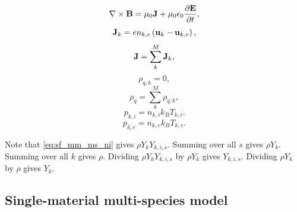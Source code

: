 \documentclass[a4paper,11pt]{report}
\begin{document}
\begin{equation}
    \label{eq:sf_mm_ms_maxwell_2}
    \nabla \times \mathbf{B} = \mu_0 \mathbf{J} + \mu_0 \epsilon_0 \frac{\partial \mathbf{E}}{\partial t},
\end{equation}
\begin{equation}
    \label{eq:sf_mm_ms_curr_density}
    \mathbf{J}_k = e n_{k,e} \left( \mathbf{u}_k - \mathbf{u}_{k,e} \right),
\end{equation}
\begin{equation}
    \mathbf{J} = \sum_k^M \mathbf{J}_k,
\end{equation}
\begin{equation}
    \label{eq:sf_mm_ms_mass_density}
    \rho_{q,k} = 0,
\end{equation}
\begin{equation}
    \rho_q = \sum_k^M \rho_{q,k},
\end{equation}
\begin{equation}
    \label{eq:sf_mm_ms_eos_ion}
    p_{k,i} = n_{k,i} k_B T_{k,i}.
\end{equation}
\begin{equation}
    \label{eq:sf_mm_ms_eos_elec}
    p_{k,e} = n_{k,e} k_B T_{k,e}.
\end{equation}

Note that \cref{eq:sf_mm_ms_ni} gives $\rho Y_k Y_{k,i,s}$. Summing over all $s$ gives $\rho Y_k$. Summing over all $k$ gives $\rho$. Dividing $\rho Y_k Y_{k,i,s}$ by $\rho Y_k$ gives $Y_{k,i,s}$. Dividing $\rho Y_k$ by $\rho$ gives $Y_k$.

\subsection{Single-material multi-species model}
\label{sec:sf_sm_ms}
\end{document}
